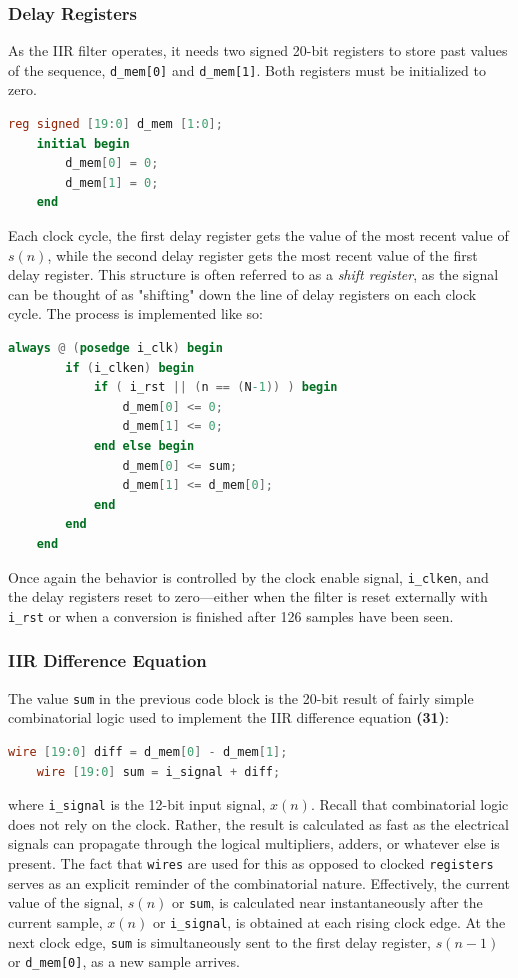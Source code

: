 \documentclass[reprint,amsmath,amssymb]{revtex4-2}
\begin{document}
\subsubsection{Delay Registers}

As the IIR filter operates, it needs two signed 20-bit registers to store past values of the sequence, \verb|d_mem[0]| and \verb|d_mem[1]|. Both registers must be initialized to zero.
\begin{lstlisting}[language=Verilog]
    reg signed [19:0] d_mem [1:0];
    initial begin
        d_mem[0] = 0;
        d_mem[1] = 0;
    end
\end{lstlisting}

Each clock cycle, the first delay register gets the value of the most recent value of $s(n)$, while the second delay register gets the most recent value of the first delay register. This structure is often referred to as a \textit{shift register}, as the signal can be thought of as "shifting" down the line of delay registers on each clock cycle. The process is implemented like so:
\begin{lstlisting}[language=Verilog]
    always @ (posedge i_clk) begin
        if (i_clken) begin
            if ( i_rst || (n == (N-1)) ) begin
                d_mem[0] <= 0;
                d_mem[1] <= 0;
            end else begin
                d_mem[0] <= sum;
                d_mem[1] <= d_mem[0];
            end
        end
    end
\end{lstlisting}

 Once again the behavior is controlled by the clock enable signal, \verb|i_clken|, and the delay registers reset to zero---either when the filter is reset externally with \verb|i_rst| or when a conversion is finished after 126 samples have been seen. 

\subsubsection{IIR Difference Equation}
 
 The value \verb|sum| in the previous code block is the 20-bit result of fairly simple combinatorial logic used to implement the IIR difference equation \textbf{(31)}:

\begin{lstlisting}[language=Verilog]
    wire [19:0] diff = d_mem[0] - d_mem[1];
    wire [19:0] sum = i_signal + diff;
\end{lstlisting}
where \verb|i_signal| is the 12-bit input signal, $x(n)$. Recall that combinatorial logic does not rely on the clock. Rather, the result is calculated as fast as the electrical signals can propagate through the logical multipliers, adders, or whatever else is present. The fact that \verb|wires| are used for this as opposed to clocked \verb|registers| serves as an explicit reminder of the combinatorial nature. Effectively, the current value of the signal, $s(n)$ or \verb|sum|, is calculated near instantaneously after the current sample, $x(n)$ or \verb|i_signal|, is obtained at each rising clock edge. At the next clock edge, \verb|sum| is simultaneously sent to the first delay register, $s(n-1)$ or \verb|d_mem[0]|, as a new sample arrives.
\end{document}
